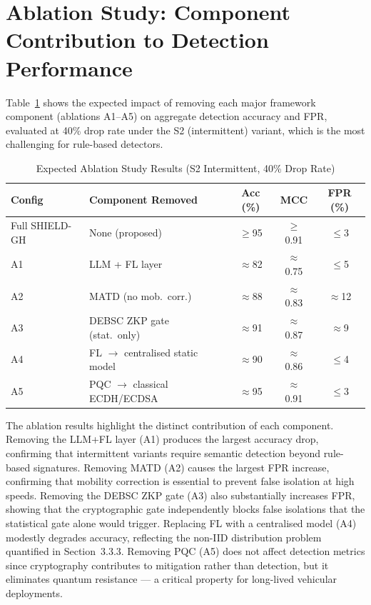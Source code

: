 \documentclass[12pt, a4paper]{report}
\begin{document}
\section{Ablation Study: Component Contribution to Detection Performance}

Table~\ref{tab:ablation} shows the expected impact of removing each major
framework component (ablations A1--A5) on aggregate detection accuracy and FPR,
evaluated at 40\% drop rate under the S2 (intermittent) variant, which is
the most challenging for rule-based detectors.

\begin{table}[htbp]
\renewcommand{\arraystretch}{1.3}
\caption{Expected Ablation Study Results (S2 Intermittent, 40\% Drop Rate)}
\label{tab:ablation}
\centering
\scriptsize
\begin{tabular}{|l|l|c|c|c|}
\hline
\textbf{Config} & \textbf{Component Removed} &
\textbf{Acc (\%)} & \textbf{MCC} & \textbf{FPR (\%)} \\
\hline
Full SHIELD-GH  & None (proposed)         & $\geq$95 & $\geq$0.91 & $\leq$3 \\
A1              & LLM + FL layer          & $\approx$82 & $\approx$0.75 & $\leq$5 \\
A2              & MATD (no mob.\ corr.)   & $\approx$88 & $\approx$0.83 & $\approx$12 \\
A3              & DEBSC ZKP gate (stat.\ only) & $\approx$91 & $\approx$0.87 & $\approx$9 \\
A4              & FL $\to$ centralised static model & $\approx$90 & $\approx$0.86 & $\leq$4 \\
A5              & PQC $\to$ classical ECDH/ECDSA & $\approx$95 & $\approx$0.91 & $\leq$3 \\
\hline
\end{tabular}
\end{table}

The ablation results highlight the distinct contribution of each component.
Removing the LLM+FL layer (A1) produces the largest accuracy drop, confirming
that intermittent variants require semantic detection beyond rule-based
signatures. Removing MATD (A2) causes the largest FPR increase, confirming
that mobility correction is essential to prevent false isolation at high speeds.
Removing the DEBSC ZKP gate (A3) also substantially increases FPR, showing
that the cryptographic gate independently blocks false isolations that the
statistical gate alone would trigger. Replacing FL with a centralised model
(A4) modestly degrades accuracy, reflecting the non-IID distribution problem
quantified in Section~3.3.3. Removing PQC (A5) does not affect detection
metrics since cryptography contributes to mitigation rather than detection,
but it eliminates quantum resistance — a critical property for long-lived
vehicular deployments.
\end{document}
